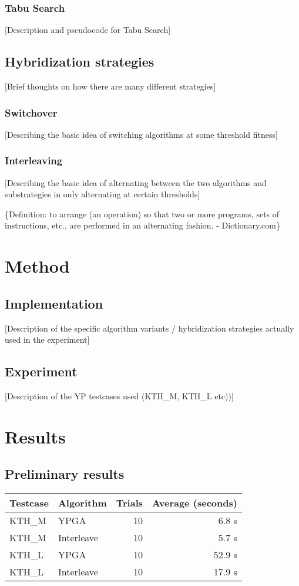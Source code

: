 \documentclass[bachelor]{kththesis}
\newcommand{\blue}[1]{{\color{blue} [#1]}}
\newcommand{\red}[1]{{\color{red} \{#1\}}}
\begin{document}
\subsection{Tabu Search}
\blue{Description and pseudocode for Tabu Search}

\section{Hybridization strategies}
\blue{Brief thoughts on how there are many different strategies}
\subsection{Switchover}
\blue{Describing the basic idea of switching algorithms at some threshold fitness}

\subsection{Interleaving}
\blue{Describing the basic idea of alternating between the two algorithms and substrategies in 
only alternating at certain thresholds}

\red{Definition: to arrange (an operation) so that two or more programs, sets of instructions, etc., are performed in an alternating fashion. - Dictionary.com}

\chapter{Method}
\section{Implementation}
\blue{Description of the specific algorithm variants / hybridization strategies actually used in the experiment}
\section{Experiment}
\blue{Description of the YP testcases used (KTH\_M, KTH\_L etc))}

\chapter{Results}
\section{Preliminary results}
\bgroup
\renewcommand{\arraystretch}{1.5}
\begin{tabular}{|l l r r|}
\hline
Testcase & Algorithm & Trials & Average (seconds)\\
\hline
KTH_M & YPGA & 10 & 6.8 s\\
KTH_M & Interleave & 10 & 5.7 s\\
\hline
KTH_L & YPGA & 10 & 52.9 s\\
KTH_L & Interleave & 10 & 17.9 s\\
\hline
\end{tabular}
\egroup
\end{document}
